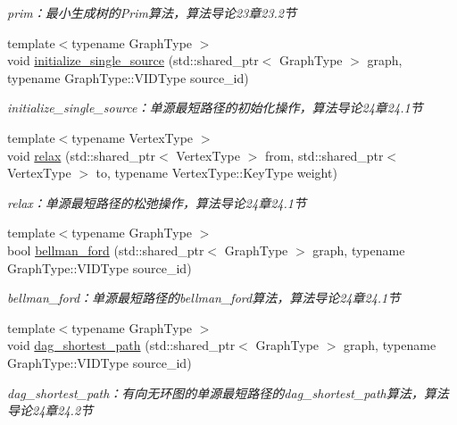\begin{DoxyCompactItemize}
\begin{DoxyCompactList}\small\item\em prim：最小生成树的\+Prim算法，算法导论23章23.2节 \end{DoxyCompactList}\item 
{\footnotesize template$<$typename Graph\+Type $>$ }\\void \hyperlink{namespace_introduction_to_algorithm_1_1_graph_algorithm_a5ed496e8825564d0f9fcfe3b0ac41dec}{initialize\+\_\+single\+\_\+source} (std\+::shared\+\_\+ptr$<$ Graph\+Type $>$ graph, typename Graph\+Type\+::\+V\+I\+D\+Type source\+\_\+id)
\begin{DoxyCompactList}\small\item\em initialize\+\_\+single\+\_\+source：单源最短路径的初始化操作，算法导论24章24.1节 \end{DoxyCompactList}\item 
{\footnotesize template$<$typename Vertex\+Type $>$ }\\void \hyperlink{namespace_introduction_to_algorithm_1_1_graph_algorithm_afe2bd83fca7df7e07ece9a59b8e7f5a6}{relax} (std\+::shared\+\_\+ptr$<$ Vertex\+Type $>$ from, std\+::shared\+\_\+ptr$<$ Vertex\+Type $>$ to, typename Vertex\+Type\+::\+Key\+Type weight)
\begin{DoxyCompactList}\small\item\em relax：单源最短路径的松弛操作，算法导论24章24.1节 \end{DoxyCompactList}\item 
{\footnotesize template$<$typename Graph\+Type $>$ }\\bool \hyperlink{namespace_introduction_to_algorithm_1_1_graph_algorithm_ae96d9b844260ee3ce9225055040c631b}{bellman\+\_\+ford} (std\+::shared\+\_\+ptr$<$ Graph\+Type $>$ graph, typename Graph\+Type\+::\+V\+I\+D\+Type source\+\_\+id)
\begin{DoxyCompactList}\small\item\em bellman\+\_\+ford：单源最短路径的bellman\+\_\+ford算法，算法导论24章24.1节 \end{DoxyCompactList}\item 
{\footnotesize template$<$typename Graph\+Type $>$ }\\void \hyperlink{namespace_introduction_to_algorithm_1_1_graph_algorithm_aec7fe196e6aee4c8e6004a05495c8813}{dag\+\_\+shortest\+\_\+path} (std\+::shared\+\_\+ptr$<$ Graph\+Type $>$ graph, typename Graph\+Type\+::\+V\+I\+D\+Type source\+\_\+id)
\begin{DoxyCompactList}\small\item\em dag\+\_\+shortest\+\_\+path：有向无环图的单源最短路径的dag\+\_\+shortest\+\_\+path算法，算法导论24章24.2节 \end{DoxyCompactList}\item 

\end{DoxyCompactItemize}
